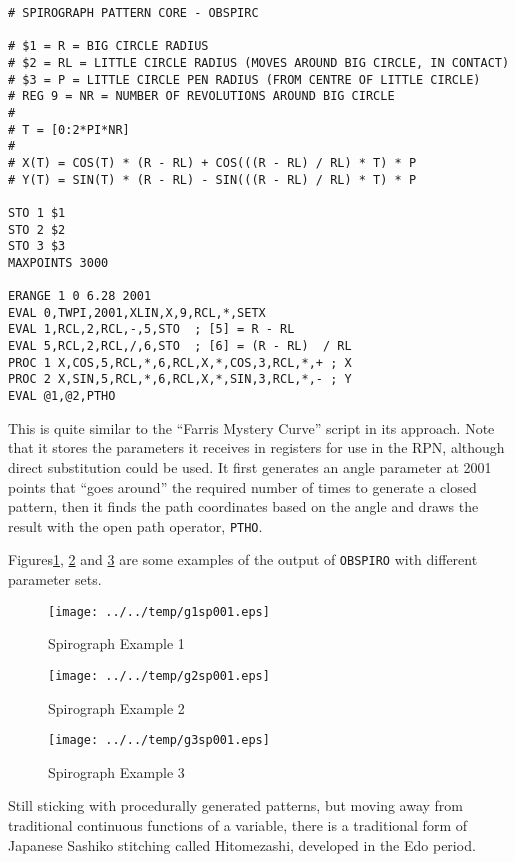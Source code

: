 \documentclass[a4paper,twoside,11pt]{article}
\makeatletter
\def\maxwidth{%
  \ifdim\Gin@nat@width>\linewidth
    \linewidth
  \else
    \Gin@nat@width
  \fi
}
\newcommand{\newpara}{\par\vspace{4mm}\noindent}
\makeatother
\begin{document}
\begin{lstlisting} 
# SPIROGRAPH PATTERN CORE - OBSPIRC

# $1 = R = BIG CIRCLE RADIUS
# $2 = RL = LITTLE CIRCLE RADIUS (MOVES AROUND BIG CIRCLE, IN CONTACT)
# $3 = P = LITTLE CIRCLE PEN RADIUS (FROM CENTRE OF LITTLE CIRCLE)
# REG 9 = NR = NUMBER OF REVOLUTIONS AROUND BIG CIRCLE
#
# T = [0:2*PI*NR]
#
# X(T) = COS(T) * (R - RL) + COS(((R - RL) / RL) * T) * P
# Y(T) = SIN(T) * (R - RL) - SIN(((R - RL) / RL) * T) * P

STO 1 $1
STO 2 $2
STO 3 $3
MAXPOINTS 3000

ERANGE 1 0 6.28 2001
EVAL 0,TWPI,2001,XLIN,X,9,RCL,*,SETX
EVAL 1,RCL,2,RCL,-,5,STO  ; [5] = R - RL
EVAL 5,RCL,2,RCL,/,6,STO  ; [6] = (R - RL)  / RL
PROC 1 X,COS,5,RCL,*,6,RCL,X,*,COS,3,RCL,*,+ ; X
PROC 2 X,SIN,5,RCL,*,6,RCL,X,*,SIN,3,RCL,*,- ; Y
EVAL @1,@2,PTHO
\end{lstlisting}

\newpara
This is quite similar to the ``Farris Mystery Curve'' script in its
approach. Note that it stores the parameters it receives in registers
for use in the RPN, although direct substitution could be used. It first
generates an angle parameter at 2001 points that ``goes around'' the
required number of times to generate a closed pattern, then it finds the
path coordinates based on the angle and draws the result with the open
path operator, \texttt{PTHO}.

\newpara
Figures\ref{fig:g1sp001}, \ref{fig:g2sp001} and \ref{fig:g3sp001} are some examples
of the output of \texttt{OBSPIRO} with different
parameter sets.

\begin{figure}
  \centering
  \texttt{[image: ../../temp/g1sp001.eps]}
  \caption{Spirograph Example 1}
  \label{fig:g1sp001}
\end{figure}

\begin{figure}
  \centering
  \texttt{[image: ../../temp/g2sp001.eps]}
  \caption{Spirograph Example 2}
  \label{fig:g2sp001}
\end{figure}

\begin{figure}
  \centering
  \texttt{[image: ../../temp/g3sp001.eps]}
  \caption{Spirograph Example 3}
  \label{fig:g3sp001}
\end{figure}

\newpara
Still sticking with procedurally generated patterns, but moving away
from traditional continuous functions of a variable, there is a
traditional form of Japanese Sashiko stitching called Hitomezashi,
developed in the Edo period.
\end{document}
